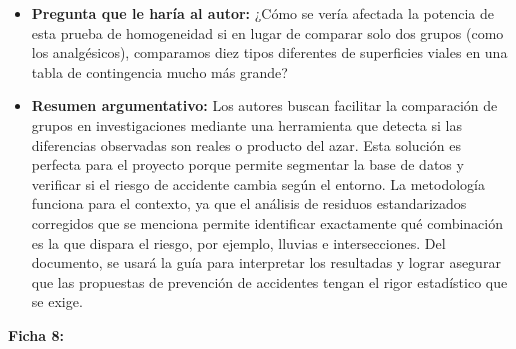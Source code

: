 \documentclass[12pt]{article}
\begin{document}
\begin{itemize}
	\item \textbf{Pregunta que le haría al autor:} ¿Cómo se vería afectada la potencia de 
	esta prueba de homogeneidad si en lugar de comparar solo dos grupos (como los analgésicos), 
	comparamos diez tipos diferentes de superficies viales en una tabla de contingencia mucho más grande?    
	\item \textbf{Resumen argumentativo:} Los autores buscan facilitar la comparación 
	de grupos en investigaciones mediante una herramienta que detecta si las diferencias 
	observadas son reales o producto del azar. Esta solución es perfecta para el proyecto 
	porque permite segmentar la base de datos y verificar si el riesgo de accidente cambia 
	según el entorno. La metodología funciona para el contexto, ya que el análisis de residuos 
	estandarizados corregidos que se menciona permite identificar exactamente qué combinación es 
	la que dispara el riesgo, por ejemplo, lluvias e intersecciones. Del documento, se usará la 
	guía para interpretar los resultadas y lograr asegurar que las propuestas de prevención de 
	accidentes tengan el rigor estadístico que se exige.\\
	\end{itemize}


\textbf{Ficha 8:}
\end{document}
